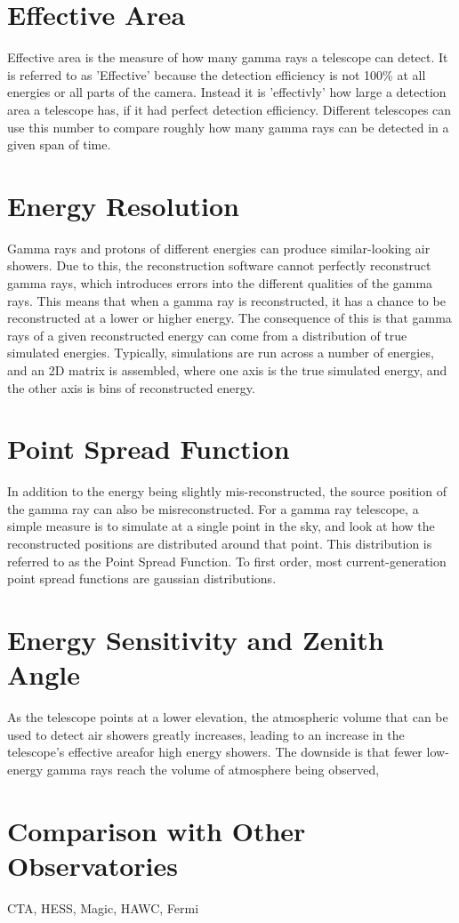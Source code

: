 \section{Effective Area}
Effective area is the measure of how many gamma rays a telescope can detect.
It is referred to as 'Effective' because the detection efficiency is not 100\% at all energies or all parts of the camera.
Instead it is 'effectivly' how large a detection area a telescope has, if it had perfect detection efficiency.
Different telescopes can use this number to compare roughly how many gamma rays can be detected in a given span of time.

\section{Energy Resolution}
Gamma rays and protons of different energies can produce similar-looking air showers.
Due to this, the reconstruction software cannot perfectly reconstruct gamma rays, which introduces errors into the different qualities of the gamma rays.
This means that when a gamma ray is reconstructed, it has a chance to be reconstructed at a lower or higher energy.
The consequence of this is that gamma rays of a given reconstructed energy can come from a distribution of true simulated energies.
Typically, simulations are run across a number of energies, and an 2D matrix is assembled, where one axis is the true simulated energy, and the other axis is bins of reconstructed energy.


\section{Point Spread Function}
In addition to the energy being slightly mis-reconstructed, the source position of the gamma ray can also be misreconstructed.
For a gamma ray telescope, a simple measure is to simulate at a single point in the sky, and look at how the reconstructed positions are distributed around that point.
This distribution is referred to as the Point Spread Function.
To first order, most current-generation point spread functions are gaussian distributions.


\section{Energy Sensitivity and Zenith Angle}

As the telescope points at a lower elevation, the atmospheric volume that can be used to detect air showers greatly increases, leading to an increase in the telescope's effective areafor high energy showers.
The downside is that fewer low-energy gamma rays reach the volume of atmosphere being observed, 

\section{Comparison with Other Observatories}


CTA, HESS, Magic, HAWC, Fermi
